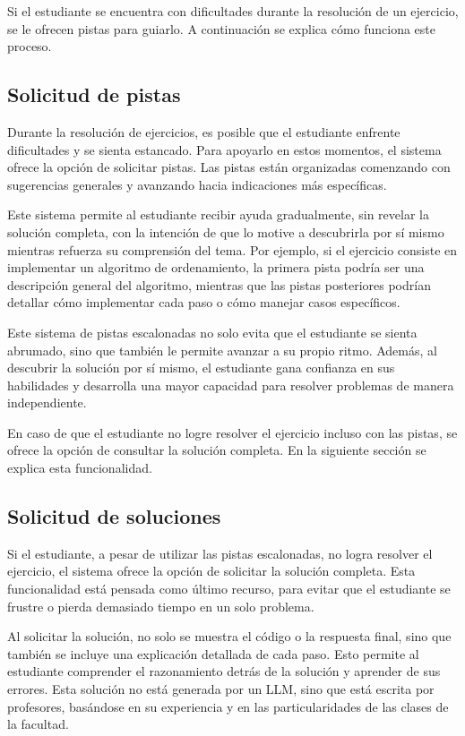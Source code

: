 \documentclass{article}
\begin{document}
Si el estudiante se encuentra con dificultades durante la resolución de un ejercicio, se le ofrecen pistas para guiarlo. A continuación se explica cómo funciona este proceso.

\subsection{Solicitud de pistas}

Durante la resolución de ejercicios, es posible que el estudiante enfrente dificultades y se sienta estancado. Para apoyarlo en estos momentos, el sistema ofrece la opción de solicitar pistas. Las pistas están organizadas comenzando con sugerencias generales y avanzando hacia indicaciones más específicas. 

Este sistema permite al estudiante recibir ayuda gradualmente, sin revelar la solución completa, con la intención de que lo motive a descubrirla por sí mismo mientras refuerza su comprensión del tema. Por ejemplo, si el ejercicio consiste en implementar un algoritmo de ordenamiento, la primera pista podría ser una descripción general del algoritmo, mientras que las pistas posteriores podrían detallar cómo implementar cada paso o cómo manejar casos específicos.

Este sistema de pistas escalonadas no solo evita que el estudiante se sienta abrumado, sino que también le permite avanzar a su propio ritmo. Además, al descubrir la solución por sí mismo, el estudiante gana confianza en sus habilidades y desarrolla una mayor capacidad para resolver problemas de manera independiente.

En caso de que el estudiante no logre resolver el ejercicio incluso con las pistas, se ofrece la opción de consultar la solución completa. En la siguiente sección se explica esta funcionalidad.

\subsection{Solicitud de soluciones}

Si el estudiante, a pesar de utilizar las pistas escalonadas, no logra resolver el ejercicio, el sistema ofrece la opción de solicitar la solución completa. Esta funcionalidad está pensada como último recurso, para evitar que el estudiante se frustre o pierda demasiado tiempo en un solo problema.

Al solicitar la solución, no solo se muestra el código o la respuesta final, sino que también se incluye una explicación detallada de cada paso. Esto permite al estudiante comprender el razonamiento detrás de la solución y aprender de sus errores. Esta solución no está generada por un LLM, sino que está escrita por profesores, basándose en su experiencia y en las particularidades de las clases de la facultad.
\end{document}
